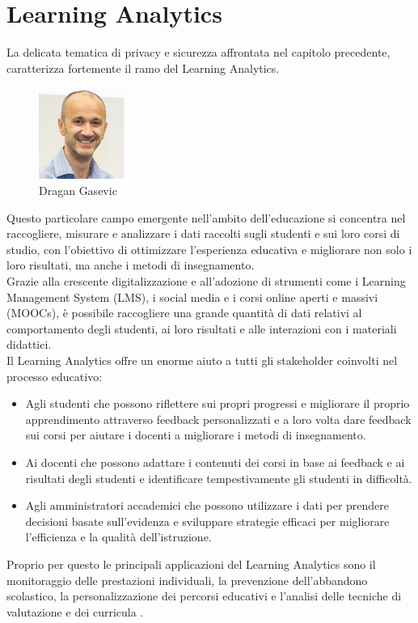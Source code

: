 \chapter{Learning Analytics}
La delicata tematica di privacy e sicurezza affrontata nel capitolo precedente, caratterizza fortemente il ramo
del Learning Analytics.
\begin{figure}
    \centering
    \includegraphics[width=0.25\textwidth]{Immagini/Dragan Gasevic.jpg}
    \caption{Dragan Gasevic}
\end{figure}
Questo particolare campo emergente nell'ambito dell'educazione si concentra nel raccogliere, misurare e analizzare i dati raccolti sugli studenti e sui loro corsi
di studio, con l'obiettivo di ottimizzare l'esperienza educativa e migliorare non solo i loro risultati, ma anche i metodi di insegnamento. 
\\Grazie alla crescente digitalizzazione e all'adozione di strumenti 
come i Learning Management System (LMS), i social media e i corsi online aperti e massivi (MOOCs), è possibile raccogliere una grande quantità di dati relativi al comportamento degli studenti, 
ai loro risultati e alle interazioni con i materiali didattici. 
\\Il Learning Analytics offre un enorme aiuto a tutti gli stakeholder coinvolti nel processo educativo:
\begin{itemize}
    \item Agli studenti che possono riflettere sui propri progressi e migliorare il proprio apprendimento attraverso feedback personalizzati e a loro volta dare feedback sui corsi per aiutare i docenti a migliorare i metodi di insegnamento.
    \item Ai docenti che possono adattare i contenuti dei corsi in base ai feedback e ai risultati degli studenti e identificare tempestivamente gli studenti in difficoltà.
    \item Agli amministratori accademici che possono utilizzare i dati per prendere decisioni basate sull'evidenza e sviluppare strategie efficaci per migliorare l'efficienza e la qualità dell'istruzione.
\end{itemize}
Proprio per questo le principali applicazioni del Learning Analytics sono il monitoraggio delle prestazioni individuali, la prevenzione dell'abbandono scolastico,
la personalizzazione dei percorsi educativi e l'analisi delle tecniche di valutazione e dei curricula \cite{wikipedia_learning_analytics}.

